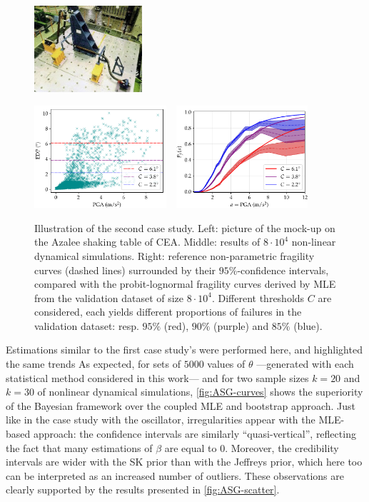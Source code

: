 \begin{figure}[h]
    \centering
    \parbox[b][3.8cm][c]{4.5cm}{%
    \includegraphics[height=3.2cm]{figures/intro-frags/ASG.jpg}\vspace*{1em}%
    }
    \includegraphics[height=3.8cm]{figures/intro-frags/asg/cloud_PGA_light.pdf}\ \ 
    \includegraphics[height=3.8cm]{figures/intro-frags/asg/refs_PGA.pdf}
    \caption{Illustration of the second case study. Left: picture of the mock-up on the Azalee shaking table of CEA. Middle: results of $8\cdot10^4$ non-linear dynamical simulations. Right: reference non-parametric fragility curves (dashed lines) surrounded by their $95\%$-confidence intervals, compared with the probit-lognormal fragility curves derived by MLE from the validation dataset of size $8\cdot 10^4$. Different thresholds $C$ are considered, each yields different proportions of failures in the validation dataset: resp. $95\%$ (red), $90\%$ (purple) and $85\%$ (blue).}
    \label{fig:PREM:asg}
\end{figure}




Estimations similar to the first case study’s were performed here, and highlighted the same trends %
As expected, for sets of $5000$ values of $\theta$ ---generated with each statistical method considered in this work--- and for two sample sizes $k = 20$ and $k = 30$ of nonlinear dynamical simulations, \cref{fig:ASG-curves} shows the superiority of the Bayesian framework over the coupled MLE and bootstrap approach. Just like in the case study with the oscillator, irregularities appear with the MLE-based approach: the confidence intervals are similarly ``quasi-vertical'', reflecting the fact that many estimations of $\beta$ are equal to $0$. Moreover, the credibility intervals are wider with the SK prior than with the Jeffreys prior, which here too can be interpreted as an increased number of outliers. %
These observations are clearly supported by the results presented in \cref{fig:ASG-scatter}.


